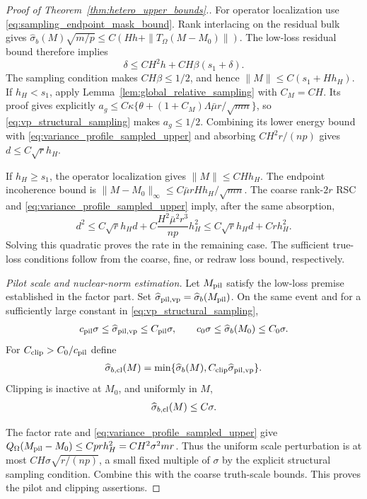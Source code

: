 \documentclass[numsec,webpdf,modern,large,namedate]{oup-authoring-template}
\theoremstyle{plain}
\theoremstyle{remark}
\newif\ifmarkchanges
\newenvironment{revision}{\begingroup\ifmarkchanges\color{red}\fi}{\endgroup}
\begin{document}
\begin{revision}
\begin{proof}[Proof of Theorem~\ref{thm:hetero_upper_bounds}.]
For operator localization use \eqref{eq:sampling_endpoint_mask_bound}.
Rank interlacing on the residual bulk gives
$\widehat\sigma_b(M)\sqrt{m/p}\le C(Hh+
\|T_\Omega(M-M_0)\|)$.
The low-loss residual bound therefore implies
\[
 \delta\le CH^2h+CH\beta(s_1+\delta).
\]
The sampling condition makes $CH\beta\le1/2$, and hence
$\|M\|\le C(s_1+Hh_H)$.
If $h_H<s_1$, apply Lemma~\ref{lem:global_relative_sampling} with $C_M=CH$.
Its proof gives explicitly
$a_g\le C\kappa\{\theta+(1+C_M)\Lambda\bar\mu r/\sqrt{mn}\}$,
so \eqref{eq:vp_structural_sampling} makes $a_g\le1/2$.
Combining its lower energy bound with \eqref{eq:variance_profile_sampled_upper}
and absorbing $CH^2r/(np)$ gives $d\le C\sqrt r h_H$.

If $h_H\ge s_1$, the operator localization gives $\|M\|\le CHh_H$.
The endpoint incoherence bound is
$\|M-M_0\|_\infty\le C\bar\mu rHh_H/\sqrt{mn}$.
The coarse rank-$2r$ RSC and \eqref{eq:variance_profile_sampled_upper} imply,
after the same absorption,
\[
 d^2\le C\sqrt r h_Hd+
            C\frac{H^2\bar\mu^2r^3}{np}h_H^2
       \le C\sqrt r h_Hd+Crh_H^2.
\]
Solving this quadratic proves the rate in the remaining case.
The sufficient true-loss conditions follow from the coarse, fine, or
redraw loss bound, respectively.  

\textit{Pilot scale and nuclear-norm estimation.} Let $M_{\rm pil}$ satisfy the low-loss premise established in the factor part.
Set $\widehat\sigma_{\rm pil,vp}=\widehat\sigma_b(M_{\rm pil})$.
On the same event and for a sufficiently large constant in
\eqref{eq:vp_structural_sampling},
\begin{align}
 c_{\rm pil}\sigma\le\widehat\sigma_{\rm pil,vp}\le C_{\rm pil}\sigma,
 \qquad c_0\sigma\le\widehat\sigma_b(M_0)\le C_0\sigma.
 \label{eq:vp_pilot_event}
\end{align}
For $C_{\rm clip}>C_0/c_{\rm pil}$ define
\begin{align}
 \widehat\sigma_{b,\rm cl}(M)=
 \min\{\widehat\sigma_b(M),C_{\rm clip}\widehat\sigma_{\rm pil,vp}\}.
 \label{eq:vp_clipped_scale}
\end{align}
Clipping is inactive at $M_0$, and uniformly in $M$,
\begin{align}
 \widehat\sigma_{b,\rm cl}(M)\le C\sigma.
 \label{eq:vp_clipped_scale_uniform}
\end{align}

The factor rate and \eqref{eq:variance_profile_sampled_upper} give
$Q_\Omega(M_{\rm pil}-M_0)\le Cp r h_H^2=CH^2\sigma^2mr$.
Thus the uniform scale perturbation is at most
$CH\sigma\sqrt{r/(np)}$, a small fixed multiple of $\sigma$ by the
explicit structural sampling condition.  Combine this with the coarse
truth-scale bounds.  This proves the pilot and clipping assertions.


\end{proof}
\end{revision}
\end{document}

